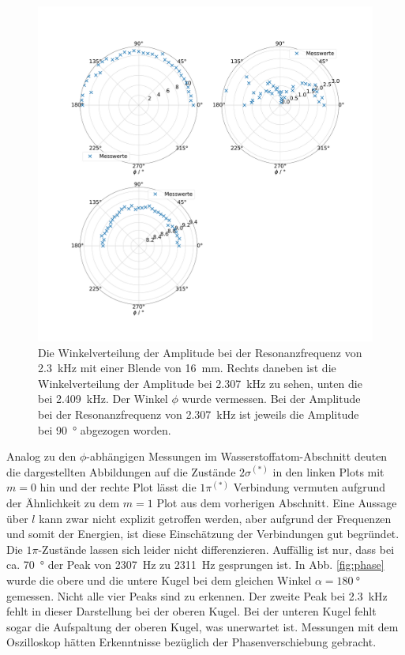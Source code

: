 \begin{figure}
    \centering
    \includegraphics[width=\textwidth]{plots/D_3.pdf}
    \caption{Die Winkelverteilung der Amplitude bei der Resonanzfrequenz von \SI{2.3}{\kilo\hertz} mit einer Blende von \SI{16}{\milli\metre}. Rechts daneben ist die Winkelverteilung der Amplitude bei \SI{2.307}{\kilo\hertz} zu sehen, unten die bei \SI{2.409}{\kilo\hertz}. Der Winkel $\phi$ wurde vermessen. Bei der Amplitude bei der Resonanzfrequenz von \SI{2.307}{\kilo\hertz} ist jeweils die Amplitude bei \SI{90}{\degree} abgezogen worden.}
    \label{fig:polar_molekuel}
\end{figure}

Analog zu den $\phi$-abhängigen Messungen im Wasserstoffatom-Abschnitt deuten die dargestellten Abbildungen auf die Zustände $2 \sigma^{(*)}$ in den linken Plots mit $m = 0$ hin und der rechte Plot lässt die $1 \pi^{(*)}$ Verbindung vermuten aufgrund der Ähnlichkeit zu dem $m=1$ Plot aus dem vorherigen Abschnitt. Eine Aussage über $l$ kann zwar nicht explizit getroffen werden, aber aufgrund der Frequenzen und somit der Energien, ist diese Einschätzung der Verbindungen gut begründet. Die $1 \pi$-Zustände lassen sich leider nicht differenzieren. Auffällig ist nur, dass bei ca. \SI{70}{\degree} der Peak von \SI{2307}{\hertz} zu \SI{2311}{\hertz} gesprungen ist. 
In Abb. \ref{fig:phase} wurde die obere und die untere Kugel bei dem gleichen Winkel $\alpha=\SI{180}{\degree}$ gemessen. 
Nicht alle vier Peaks sind zu erkennen. Der zweite Peak bei \SI{2.3}{\kilo\hertz} fehlt in dieser Darstellung bei der oberen Kugel. Bei der unteren Kugel fehlt sogar die Aufspaltung der oberen Kugel, was unerwartet ist. Messungen mit dem Oszilloskop hätten Erkenntnisse bezüglich der Phasenverschiebung gebracht. 

